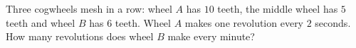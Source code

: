 Three cogwheels mesh in a row: wheel $A$ has $10$ teeth, the middle wheel has $5$ teeth and wheel $B$ has $6$ teeth. Wheel $A$ makes one revolution every $2$ seconds. How many revolutions does wheel $B$ make every minute?
